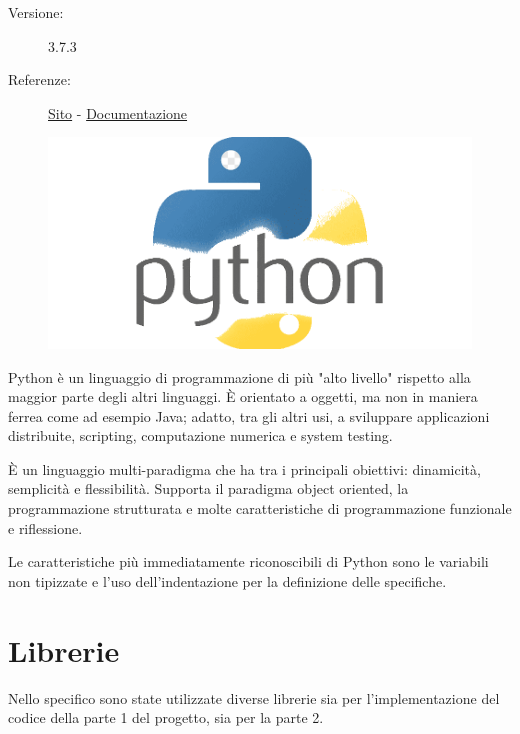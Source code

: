 \documentclass[preprint,12pt]{elsarticle}
\begin{document}
\medskip
\begin{description}
\item[Versione:] 3.7.3
\item[Referenze:] \href{https://www.python.org}{Sito} - \href{https://docs.python.org/3/}{Documentazione}
\end{description}

\begin{figure}[H]
	\centering
	\includegraphics[width=.3\linewidth]{logo}
\end{figure}

Python è un linguaggio di programmazione di più "alto livello" rispetto alla maggior parte degli altri linguaggi. È orientato a oggetti, ma non in maniera ferrea come ad esempio Java; adatto, tra gli altri usi, a sviluppare applicazioni distribuite, scripting, computazione numerica e system testing.

È un linguaggio multi-paradigma che ha tra i principali obiettivi: dinamicità, semplicità e flessibilità. Supporta il paradigma object oriented, la programmazione strutturata e molte caratteristiche di programmazione funzionale e riflessione.

Le caratteristiche più immediatamente riconoscibili di Python sono le variabili non tipizzate e l'uso dell'indentazione per la definizione delle specifiche. \\

\section{Librerie}
Nello specifico sono state utilizzate diverse librerie sia per l'implementazione del codice della parte 1 del progetto, sia per la parte 2.
\end{document}
